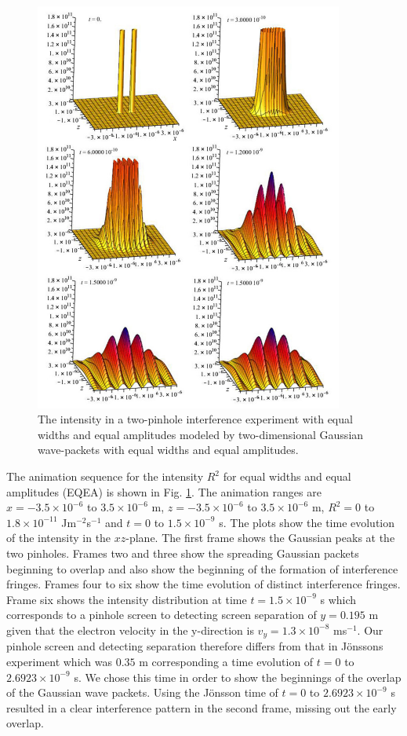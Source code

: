 \documentclass[12pt]{article}       %
\begin{document}
\begin{figure}[h]
\unitlength=1in 
\hspace*{1.1in}\includegraphics[width=4in,height=5.33in]  {figure6.jpg} 
\caption{The intensity in a two-pinhole interference experiment with  equal widths and equal amplitudes modeled by two-dimensional Gaussian wave-packets with equal widths and equal amplitudes.\label{INT2DG}}
\end{figure}
The animation sequence for the intensity $R^2$ for equal widths and equal amplitudes (EQEA) is shown in Fig. \ref{INT2DG}. The animation ranges are $x=-3.5\times 10^{-6}$ to $3.5\times 10^{-6}$ m, $z=-3.5\times 10^{-6}$ to $3.5\times 10^{-6}$ m, $R^2 = 0$ to $1.8\times 10^{-11}$ Jm$^{-2}$s$^{-1}$ and $t=0$ to $1.5\times 10^{-9}$ s. The plots show the time evolution of the intensity in the $xz$-plane. The first frame shows the Gaussian peaks at the  two pinholes. Frames  two and three show the spreading Gaussian packets beginning to overlap and also show the beginning of the formation of interference fringes.   Frames four to six show the time evolution of distinct interference fringes. Frame six shows the intensity distribution at time $t=1.5\times 10^{-9}$ s which corresponds to a pinhole screen  to detecting screen separation of $y = 0.195$ m given that the  electron  velocity in the y-direction is $v_y = 1.3 \times 10^{-8}$ ms$^{-1}$. Our pinhole screen and detecting separation therefore differs from that in J\"{o}nssons experiment which was $0.35$ m corresponding a time evolution of $t=0$ to $2.6923\times 10^{-9}$ s. We chose this time in order to  show the beginnings of the overlap of the Gaussian wave packets. Using the J\"{o}nsson  time of $t=0$ to $2.6923\times 10^{-9}$ s resulted in a clear interference pattern in the second frame, missing out the early overlap.
\end{document}
